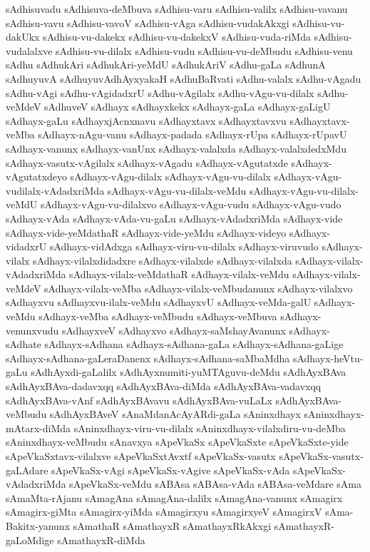 {sAdhisuvadu
sAdhisuva-deMbuva
sAdhisu-varu
sAdhisu-valilx
sAdhisu-vavanu
sAdhisu-vavu
sAdhisu-vavoV
sAdhisu-vAga
sAdhisu-vudakAkxgi
sAdhisu-vu-dakUkx
sAdhisu-vu-dakekx
sAdhisu-vu-dakekxV
sAdhisu-vuda-riMda
sAdhisu-vudalalxve
sAdhisu-vu-dilalx
sAdhisu-vudu
sAdhisu-vu-deMbudu
sAdhisu-venu
sAdhu
sAdhukAri
sAdhukAri-yeMdU
sAdhukAriV
sAdhu-gaLa
sAdhunA
sAdhuyuvA
sAdhuyuvAdhAyxyakaH
sAdhuBaRvati
sAdhu-valalx
sAdhu-vAgadu
sAdhu-vAgi
sAdhu-vAgidadxrU
sAdhu-vAgilalx
sAdhu-vAgu-vu-dilalx
sAdhu-veMdeV
sAdhuveV
sAdhayx
sAdhayxkekx
sAdhayx-gaLa
sAdhayx-gaLigU
sAdhayx-gaLu
sAdhayxjAcnxnavu
sAdhayxtavx
sAdhayxtavxvu
sAdhayxtavx-veMba
sAdhayx-nAgu-vanu
sAdhayx-padada
sAdhayx-rUpa
sAdhayx-rUpavU
sAdhayx-vanunx
sAdhayx-vanUnx
sAdhayx-valalxda
sAdhayx-valalxdedxMdu
sAdhayx-vasutx-vAgilalx
sAdhayx-vAgadu
sAdhayx-vAgutatxde
sAdhayx-vAgutatxdeyo
sAdhayx-vAgu-dilalx
sAdhayx-vAgu-vu-dilalx
sAdhayx-vAgu-vudilalx-vAdadxriMda
sAdhayx-vAgu-vu-dilalx-veMdu
sAdhayx-vAgu-vu-dilalx-veMdU
sAdhayx-vAgu-vu-dilalxvo
sAdhayx-vAgu-vudu
sAdhayx-vAgu-vudo
sAdhayx-vAda
sAdhayx-vAda-vu-gaLu
sAdhayx-vAdadxriMda
sAdhayx-vide
sAdhayx-vide-yeMdathaR
sAdhayx-vide-yeMdu
sAdhayx-videyo
sAdhayx-vidadxrU
sAdhayx-vidAdxga
sAdhayx-viru-vu-dilalx
sAdhayx-viruvudo
sAdhayx-vilalx
sAdhayx-vilalxdidadxre
sAdhayx-vilalxde
sAdhayx-vilalxda
sAdhayx-vilalx-vAdadxriMda
sAdhayx-vilalx-veMdathaR
sAdhayx-vilalx-veMdu
sAdhayx-vilalx-veMdeV
sAdhayx-vilalx-veMba
sAdhayx-vilalx-veMbudanunx
sAdhayx-vilalxvo
sAdhayxvu
sAdhayxvu-ilalx-veMdu
sAdhayxvU
sAdhayx-veMda-galU
sAdhayx-veMdu
sAdhayx-veMba
sAdhayx-veMbudu
sAdhayx-veMbuva
sAdhayx-venunxvudu
sAdhayxveV
sAdhayxvo
sAdhayx-saMshayAvanunx
sAdhayx-sAdhate
sAdhayx-sAdhana
sAdhayx-sAdhana-gaLa
sAdhayx-sAdhana-gaLige
sAdhayx-sAdhana-gaLeraDanenx
sAdhayx-sAdhana-saMbaMdha
sAdhayx-heVtu-gaLu
sAdhAyxdi-gaLalilx
sAdhAyxnumiti-yuMTAguvu-deMdu
sAdhAyxBAva
sAdhAyxBAva-dadavxqq
sAdhAyxBAva-diMda
sAdhAyxBAva-vadavxqq
sAdhAyxBAva-vAnf
sAdhAyxBAvavu
sAdhAyxBAva-vuLaLx
sAdhAyxBAva-veMbudu
sAdhAyxBAveV
sAnaMdanAcAyARdi-gaLa
sAninxdhayx
sAninxdhayx-mAtarx-diMda
sAninxdhayx-viru-vu-dilalx
sAninxdhayx-vilalxdiru-vu-deMba
sAninxdhayx-veMbudu
sAnavxya
sApeVkaSx
sApeVkaSxte
sApeVkaSxte-yide
sApeVkaSxtavx-vilalxve
sApeVkaSxtAvxtf
sApeVkaSx-vasutx
sApeVkaSx-vasutx-gaLAdare
sApeVkaSx-vAgi
sApeVkaSx-vAgive
sApeVkaSx-vAda
sApeVkaSx-vAdadxriMda
sApeVkaSx-veMdu
sABAsa
sABAsa-vAda
sABAsa-veMdare
sAma
sAmaMta-rAjanu
sAmagAna
sAmagAna-dalilx
sAmagAna-vanunx
sAmagirx
sAmagirx-giMta
sAmagirx-yiMda
sAmagirxyu
sAmagirxyeV
sAmagirxV
sAma-Bakitx-yanunx
sAmathaR
sAmathayxR
sAmathayxRkAkxgi
sAmathayxR-gaLoMdige
sAmathayxR-diMda
}
